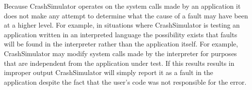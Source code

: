         Because CrashSimulator operates on the system calls made by an application it does not make any attempt to
        determine what the cause of a fault may have been at a higher level. For example, in situations where
        CrashSimulator is testing an application written in an interpreted language the possibility exists that faults
        will be found in the interpreter rather than the application itself. For example, CrashSimulator may modify
        system calls made by the interpreter for purposes that are independent from the application under test.  If this
        results results in improper output CrashSimulator will simply report it as a fault in the application despite
        the fact that the user's code was not responsible for the error.
